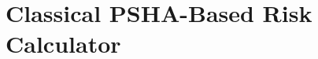 \documentclass[11pt,a4paper,headings=small,dvips]{scrbook}
\begin{document}
\chapter{Classical PSHA-Based Risk Calculator}
	\label{chap:risk_psha_based}
	
%	
%	
%	
%	
\end{document}
